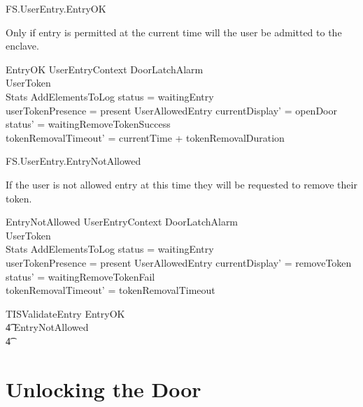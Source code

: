 \begin{traceunit}{FS.UserEntry.EntryOK}
\end{traceunit}


Only if entry is permitted at the current time will the user be
admitted to the enclave.

\begin{schema}{EntryOK}
        UserEntryContext
\also
        \Xi DoorLatchAlarm
\\      \Xi UserToken
\\      \Xi Stats
\also
        AddElementsToLog
\where
        status = waitingEntry
\\      userTokenPresence = present
\also
        UserAllowedEntry
\also
        currentDisplay' = openDoor
\\      status' = waitingRemoveTokenSuccess
\\      tokenRemovalTimeout' = currentTime + tokenRemovalDuration
\end{schema}

\begin{traceunit}{FS.UserEntry.EntryNotAllowed}
\end{traceunit}

If the user is not allowed entry at this time they will be
requested to remove their token.

\begin{schema}{EntryNotAllowed}
        UserEntryContext
\also
        \Xi DoorLatchAlarm
\\      \Xi UserToken
\\      \Xi Stats       
\also
        AddElementsToLog
\where
        status = waitingEntry
\\      userTokenPresence = present
\also
        \lnot UserAllowedEntry
\also
        currentDisplay' = removeToken
\\      status' = waitingRemoveTokenFail
\\      tokenRemovalTimeout' = tokenRemovalTimeout
\end{schema}

\begin{zed}
        TISValidateEntry  EntryOK
\\ \t4          \lor EntryNotAllowed
\\ \t4          \lor [~ UserTokenTorn | status = waitingEntry ~] 
\end{zed}


\section{Unlocking the Door}

